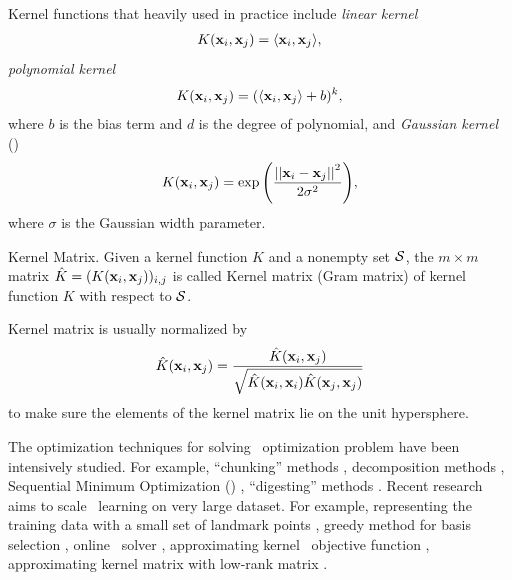 {Kernel functions that heavily used in practice include \textit{linear kernel}
\begin{align*}
	K(\mathbf {x}_i,\mathbf {x}_j) = \langle \mathbf {x}_i, \mathbf {x}_j \rangle,
\end{align*}
\textit{polynomial kernel}
\begin{align*}
	K(\mathbf {x}_i,\mathbf {x}_j) = (\langle \mathbf {x}_i, \mathbf {x}_j \rangle + b)^k,
\end{align*}
where $b$ is the bias term and $d$ is the degree of polynomial, and \textit{Gaussian kernel} (\rbf)
\begin{align*}
	K(\mathbf {x}_i,\mathbf {x}_j) = \exp{\left(\frac{\left|\left| {\mathbf {x}_i}-{\mathbf {x}_j} \right|\right|^2}{2\sigma^2}\right)},
\end{align*}
where $\sigma$ is the Gaussian width parameter.
\begin{definition}{Kernel Matrix.}
	Given a kernel function $K$ and a nonempty set $\mathcal{S}$, the $m\times m$ matrix $\hat{K}=(K(\mathbf {x}_i,\mathbf {x}_j))_{i,j}$ is called Kernel matrix (Gram matrix) of kernel function $K$ with respect to $\mathcal{S}$.
\end{definition}
Kernel matrix is usually normalized by
\begin{align*}
	\hat{K}(\mathbf {x}_i,\mathbf {x}_j) = \frac{\hat{K}(\mathbf {x}_i,\mathbf {x}_j)}{\sqrt{\hat{K}(\mathbf {x}_i,\mathbf {x}_i)\hat{K}(\mathbf {x}_j,\mathbf {x}_j)}}
\end{align*}
to make sure the elements of the kernel matrix lie on the unit hypersphere.

The optimization techniques for solving \svm\ optimization problem have been intensively studied.
For example, ``chunking'' methods \citep{Vapnik82estimation,Perezcruz04double}, decomposition methods \citep{Osuna97an,Joachims98making}, {Sequential Minimum Optimization} (\smo) \citep{Platt98sequential,Platt99fast}, ``digesting'' methods \citep{Decoste02support}.
Recent research aims to scale \svm\ learning on very large dataset.
For example, representing the training data with a small set of landmark points \citep{Pavlov00towards,Boley04training,Yu05making,Zhang08improved}, greedy method for basis selection \citep{Keerthi06building}, online \svm\ solver \citep{Bordes05fast}, approximating kernel \svm\ objective function \citep{Zhang12scaling, Le13fast}, approximating kernel matrix with low-rank matrix \citep{Smola00sparse,Fine02efficient,Drineas05on,Si14memory}.



}
